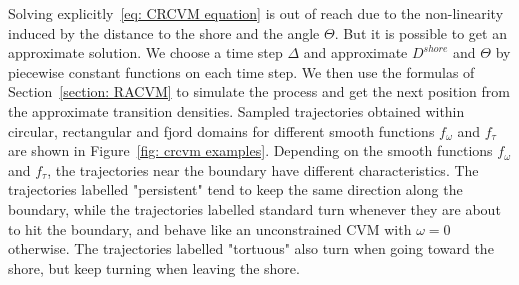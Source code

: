 \documentclass[aoas]{imsart}
\theoremstyle{definition}
\theoremstyle{remark}
\theoremstyle{remark}
\newcommand {\1}{\mathbb{1}}
\begin{document}
Solving explicitly~\eqref{eq: CRCVM equation} is out of reach due to the non-linearity induced by the distance to the shore and the angle $\Theta$. But it is possible to get an approximate solution. We choose a time step $\Delta$ and approximate $D^{shore}$ and $\Theta$ by piecewise constant functions on each time step. We then use the formulas of Section~\ref{section: RACVM} to simulate the process and get the next position from the approximate transition densities. Sampled trajectories obtained within circular, rectangular and fjord domains for different smooth functions $f_{\omega}$ and $f_{\tau}$ are shown in Figure~\ref{fig: crcvm examples}. Depending on the smooth functions $f_{\omega}$ and $f_{\tau}$, the trajectories near the boundary have different characteristics. The trajectories labelled "persistent" tend to keep the same direction along the boundary, while the trajectories labelled standard turn whenever they are about to hit the boundary, and behave like an unconstrained CVM with $\omega=0$ otherwise.  The trajectories labelled "tortuous" also turn when going toward the shore, but keep turning when leaving the shore.\\
\end{document}

